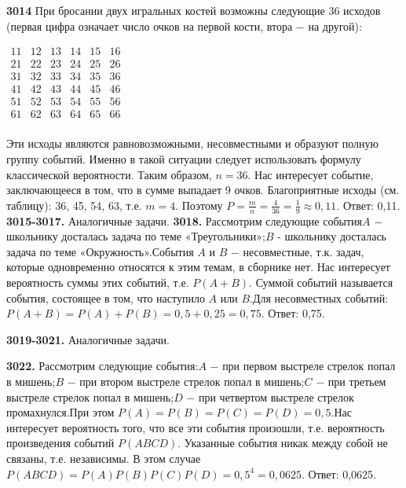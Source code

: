 \textbf{3014} При бросании двух игральных костей возможны следующие 36 исходов (первая цифра означает число очков на первой кости, втора $-$ на другой):
\begin{center}$
\begin{matrix}
11& 12& 13& 14& 15& 16&\\
21& 22& 23& 24& 25& 26&\\
31& 32& 33& 34& 35& 36&\\
41& 42& 43& 44& 45& 46&\\
51& 52& 53& 54& 55& 56&\\
61& 62& 63& 64& 65& 66&\\
\end{matrix}$
\end{center}
Эти исходы являются равновозможными, несовместными и образуют полную группу событий. Именно в такой ситуации следует использовать формулу классической вероятности. Таким образом, $n=36.$
Нас интересует событие, заключающееся в том, что в сумме выпадает 9 очков. Благоприятные исходы (см. таблицу): 36, 45, 54, 63, т.е. $m=4$. Поэтому $P = \frac{m}{n}=\frac{4}{36}=\frac{1}{9}\approx0,11.$ \newline \null \hspace*{\fill} Ответ: 0,11. \newline
\textbf{3015-3017.} Аналогичные задачи.\newline
\textbf{3018.} Рассмотрим следующие события\newline$A$ $-$ школьнику досталась задача по теме «Треугольники»;\newline$B$ - школьнику досталась задача по теме «Окружность».\newline События $A$ и $B$ $-$ несовместные, т.к. задач, которые одновременно относятся к этим темам, в сборнике нет. Нас интересует вероятность суммы этих событий, т.е. $P(A+B)$. Суммой событий называется события, состоящее в том, что наступило $A$ или $B$.\newline Для несовместных событий: $P(A+B)=P(A)+P(B)=0,5+0,25=0,75.$\null \hspace*{\fill} Ответ: 0,75. 

\textbf{3019-3021.} Аналогичные задачи.

\textbf{3022.} Рассмотрим следующие события:\newline $A$ $-$ при первом выстреле стрелок попал в мишень;\newline$B$ $-$ при втором выстреле стрелок попал в мишень;\newline$C$ $-$ при третьем выстреле стрелок попал в мишень;\newline$D$ $-$ при четвертом выстреле стрелок промахнулся.\newline При этом $P(A)=P(B)=P(C)=P(D)=0,5.$\newline Нас интересует вероятность того, что все эти события произошли, т.е. вероятность произведения событий $P(ABCD)$. Указанные события никак между собой не связаны, т.е. независимы. В этом случае $P(ABCD)=P(A)P(B)P(C)P(D)=0,5^4=0,0625.$ \newline \null \hspace*{\fill} Ответ: 0,0625. 

